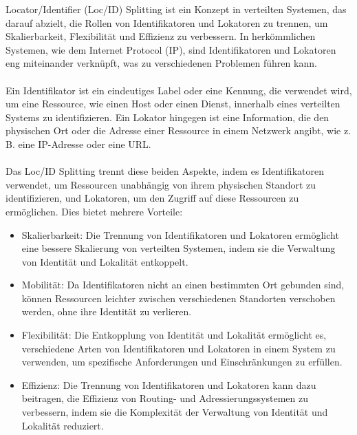 \documentclass[../vs-script-first-v01.tex]{subfiles}
\begin{document}
Locator/Identifier (Loc/ID) Splitting ist ein Konzept in verteilten Systemen, das darauf abzielt, die Rollen von Identifikatoren und Lokatoren zu trennen, um Skalierbarkeit, Flexibilität und Effizienz zu verbessern. In herkömmlichen Systemen, wie dem Internet Protocol (IP), sind Identifikatoren und Lokatoren eng miteinander verknüpft, was zu verschiedenen Problemen führen kann.
\\\\
Ein Identifikator ist ein eindeutiges Label oder eine Kennung, die verwendet wird, um eine Ressource, wie einen Host oder einen Dienst, innerhalb eines verteilten Systems zu identifizieren. Ein Lokator hingegen ist eine Information, die den physischen Ort oder die Adresse einer Ressource in einem Netzwerk angibt, wie z. B. eine IP-Adresse oder eine URL.
\\\\
Das Loc/ID Splitting trennt diese beiden Aspekte, indem es Identifikatoren verwendet, um Ressourcen unabhängig von ihrem physischen Standort zu identifizieren, und Lokatoren, um den Zugriff auf diese Ressourcen zu ermöglichen. Dies bietet mehrere Vorteile:
\begin{itemize}
\item Skalierbarkeit: Die Trennung von Identifikatoren und Lokatoren ermöglicht eine bessere Skalierung von verteilten Systemen, indem sie die Verwaltung von Identität und Lokalität entkoppelt.
\item Mobilität: Da Identifikatoren nicht an einen bestimmten Ort gebunden sind, können Ressourcen leichter zwischen verschiedenen Standorten verschoben werden, ohne ihre Identität zu verlieren.
\item Flexibilität: Die Entkopplung von Identität und Lokalität ermöglicht es, verschiedene Arten von Identifikatoren und Lokatoren in einem System zu verwenden, um spezifische Anforderungen und Einschränkungen zu erfüllen.
\item Effizienz: Die Trennung von Identifikatoren und Lokatoren kann dazu beitragen, die Effizienz von Routing- und Adressierungssystemen zu verbessern, indem sie die Komplexität der Verwaltung von Identität und Lokalität reduziert.
\end{itemize}
\end{document}
